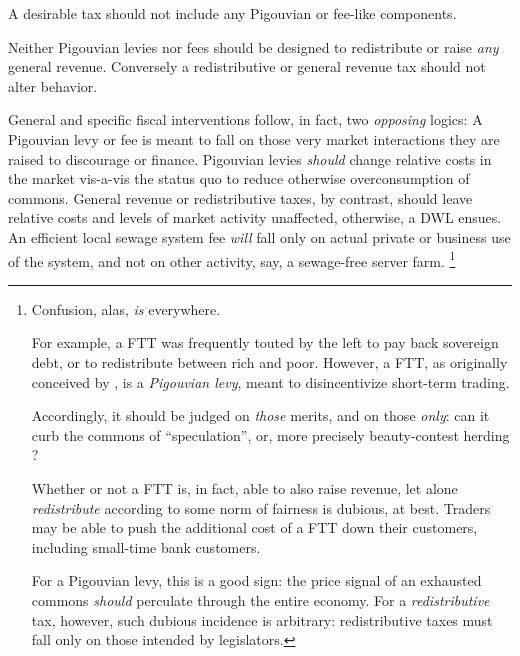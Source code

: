
\begin{desideratum}
	\label{des:ordoliberal-hygiene}
	A desirable tax should not include any Pigouvian or fee-like components.
\end{desideratum}


Neither Pigouvian levies nor fees should be designed to redistribute or raise \emph{any} general revenue.
%
Conversely a redistributive or general revenue tax should not alter behavior.

General and specific fiscal interventions follow, in fact, two \emph{opposing} logics:
A Pigouvian levy or fee is meant to fall on those very market interactions they are raised to discourage or finance.
Pigouvian levies \emph{should} change relative costs in the market vis-a-vis the status quo to reduce otherwise overconsumption of commons.
General revenue or redistributive taxes, by contrast, should leave relative costs and levels of market activity unaffected, otherwise, a \gls{DWL} ensues.
An efficient local sewage system fee \emph{will} fall only on actual private or business use of the system, and not on other activity, say, a sewage-free server farm.
\footnote{
	Confusion, alas, \emph{is} everywhere.

	For example, a \gls{FTT} was frequently touted by the left to pay back sovereign debt, or to redistribute between rich and poor.
	However, a \gls{FTT}, as originally conceived by \cite{Tobin1970}, is a \emph{Pigouvian levy}, meant to disincentivize short-term trading.

	Accordingly, it should be judged on \emph{those} merits, and on those \emph{only}:
	can it curb the commons of ``speculation'', or, more precisely beauty-contest \citep{Keynes1936} herding \citep{Banerjee-1992-aa}?

	Whether or not a \gls{FTT} is, in fact, able to also raise revenue, let alone \emph{redistribute} according to some norm of fairness is dubious, at best.
	Traders may be able to push the additional cost of a \gls{FTT} down their customers, including small-time bank customers.

	For a Pigouvian levy, this is a good sign:
	the price signal of an exhausted commons \emph{should} perculate through the entire economy.
	For a \emph{redistributive} tax, however, such dubious incidence is arbitrary:
	redistributive taxes must fall only on those intended by legislators.
}

